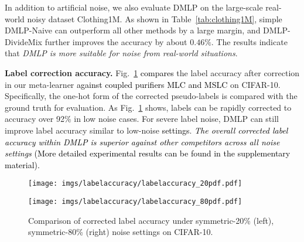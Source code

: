 \documentclass[10pt,twocolumn,letterpaper]{article}
\newcommand{\zbs}[1]{\textcolor{black}{#1}}
\newcommand{\zbsN}[1]{\textcolor{black}{#1}}
\begin{document}


In addition to artificial noise, we also evaluate DMLP on the large-scale real-world noisy dataset Clothing1M. As shown in Table~\ref{tab:clothing1M}, {simple DMLP-Naive can} outperform all other methods by a large margin, {and DMLP-DivideMix further improves the accuracy by about $0.46\%$}. The results indicate that \emph{DMLP is more suitable for noise from real-world situations}. 


 \textbf{Label correction accuracy.} Fig.~\ref{fig:corrected_label} \zbs{compares} the label accuracy {after correction in our meta-learner} \zbs{against coupled purifiers MLC and MSLC} on CIFAR-10. Specifically, the one-hot form of the corrected pseudo-labels is {compared} with the ground truth {for evaluation}. As Fig.~\ref{fig:corrected_label} shows, labels can be rapidly corrected to {accuracy} over 92\% in low noise cases. For severe label noise, DMLP can still improve label accuracy similar {to} low-noise \zbsN{settings}.
\zbs{\emph{The overall corrected label accuracy within DMLP is superior against other competitors across all noise settings} (More detailed experimental results can be found in the supplementary material). } 
\begin{figure}[!t]
 \centering
\small
 \begin{minipage}{0.236\textwidth}
    \centering
    \texttt{[image: imgs/labelaccuracy/labelaccuracy\_20pdf.pdf]}
\end{minipage}
 \begin{minipage}{0.236\textwidth}
    \centering
    \texttt{[image: imgs/labelaccuracy/labelaccuracy\_80pdf.pdf]}   
\end{minipage}
\vspace{-1em}
  \caption
    {
    \small
        Comparison of corrected label accuracy under symmetric-20\% (left), symmetric-80\% (right) noise settings on CIFAR-10. }
  \label{fig:corrected_label}
  \vspace{-2mm}
 \end{figure}
\end{document}
